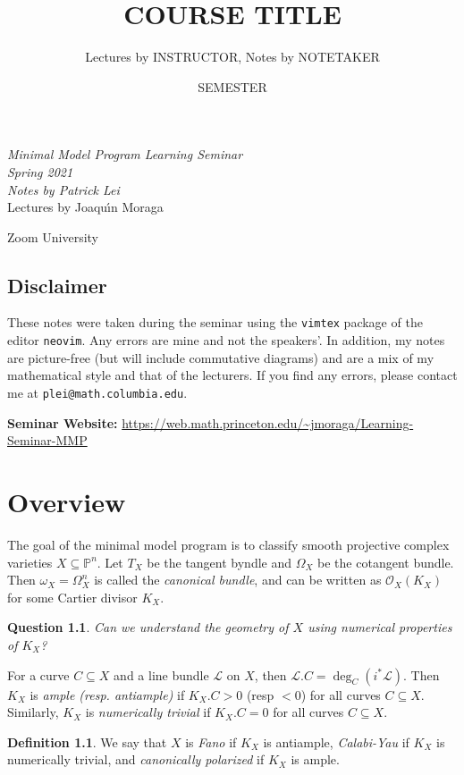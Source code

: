 \documentclass[leqno, openany]{memoir}
\title{COURSE TITLE}
\author{Lectures by INSTRUCTOR, Notes by NOTETAKER}
\date{SEMESTER}
\newtheorem{quest}[thm]{Question}
\theoremstyle{definition}
\newtheorem{defn}[thm]{Definition}
\theoremstyle{remark}
\theoremstyle{plain}
\theoremstyle{definition}
\theoremstyle{remark}
\renewcommand{\P}{\mathbb{P}}
\newcommand{\msc}[1]{\mathscr{#1}}
\newcommand*{\titleSW}
    {\begingroup%
    \raggedleft
    \vspace*{\baselineskip}
    {\Huge\itshape Minimal Model Program Learning Seminar \\ Spring 2021}\\[\baselineskip]
    {\large\itshape Notes by Patrick Lei}\\[0.2\textheight]
    {\Large Lectures by Joaqu\'{\i}n Moraga}\par
    \vfill
    {\Large \sffamily Zoom University}
    \vspace*{\baselineskip}
\endgroup}
\begin{document}
    
\begin{titlingpage}
\titleSW
\end{titlingpage}

\thispagestyle{empty}
\section*{Disclaimer}%
\label{sec:disclaimer}

These notes were taken during the seminar using the \texttt{vimtex} package of the editor \texttt{neovim}. 
Any errors are mine and not the speakers'. 
In addition, my notes are picture-free (but will include commutative diagrams) and are a mix of my mathematical style and that of the lecturers.
If you find any errors, please contact me at \texttt{plei@math.columbia.edu}.

\vspace*{1cm}

\noindent\textbf{Seminar Website:}  \url{https://web.math.princeton.edu/~jmoraga/Learning-Seminar-MMP}
\newpage


\tableofcontents

\chapter{Overview}%
\label{cha:overview}

The goal of the minimal model program is to classify smooth projective complex varieties $X \subseteq \P^n$. Let $T_X$ be the tangent byndle and $\Omega_X$ be the cotangent bundle. Then $\omega_X = \Omega_X^n$ is called the \textit{canonical bundle}, and can be written as $\msc{O}_X(K_X)$ for some Cartier divisor $K_X$.

\begin{quest}
    Can we understand the geometry of $X$ using numerical properties of $K_X$?
\end{quest}

For a curve $C \subseteq X$ and a line bundle $\msc{L}$ on $X$, then $\msc{L}.C = \deg_C(i^* \msc{L})$. Then $K_X$ is \textit{ample (resp. antiample)} if $K_X . C > 0$ (resp $<0$) for all curves $C \subseteq X$. Similarly, $K_X$ is \textit{numerically trivial} if $K_X . C = 0$ for all curves $C \subseteq X$.

\begin{defn}
    We say that $X$ is \textit{Fano} if $K_X$ is antiample, \textit{Calabi-Yau} if $K_X$ is numerically trivial, and \textit{canonically polarized} if $K_X$ is ample.
\end{defn}
\end{document}
